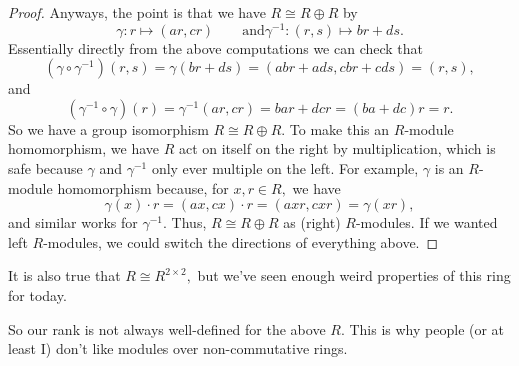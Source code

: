 \begin{proof}
	Anyways, the point is that we have $R\cong R\oplus R$ by
	\[\gamma:r\mapsto(ar,cr)\qquad\text{and}\gamma^{-1}:(r,s)\mapsto br+ds.\]
	Essentially directly from the above computations we can check that
	\[\left(\gamma\circ\gamma^{-1}\right)(r,s)=\gamma(br+ds)=(abr+ads,cbr+cds)=(r,s),\]
	and
	\[\left(\gamma^{-1}\circ\gamma\right)(r)=\gamma^{-1}(ar,cr)=bar+dcr=(ba+dc)r=r.\]
	So we have a group isomorphism $R\cong R\oplus R.$ To make this an $R$-module homomorphism, we have $R$ act on itself on the right by multiplication, which is safe because $\gamma$ and $\gamma^{-1}$ only ever multiple on the left. For example, $\gamma$ is an $R$-module homomorphism because, for $x,r\in R,$ we have
	\[\gamma(x)\cdot r=(ax,cx)\cdot r=(axr,cxr)=\gamma(xr),\]
	and similar works for $\gamma^{-1}.$ Thus, $R\cong R\oplus R$ as (right) $R$-modules. If we wanted left $R$-modules, we could switch the directions of everything above.
\end{proof}
\begin{remark}
	It is also true that $R\cong R^{2\times2},$ but we've seen enough weird properties of this ring for today.
\end{remark}
So our rank is not always well-defined for the above $R.$ This is why people (or at least I) don't like modules over non-commutative rings.

